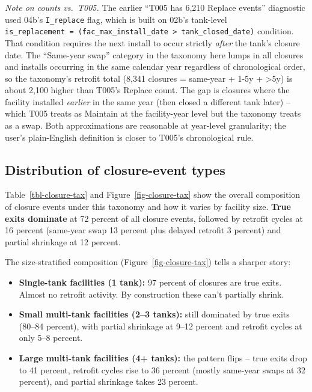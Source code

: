 \documentclass[
  11pt,
]{article}
\providecommand{\tightlist}{%
  \setlength{\itemsep}{0pt}\setlength{\parskip}{0pt}}\usepackage{longtable,booktabs,array}
\begin{document}
\emph{Note on counts vs.~T005.} The earlier ``T005 has 6,210 Replace
events'' diagnostic used 04b's \texttt{I\_replace} flag, which is built
on 02b's tank-level
\texttt{is\_replacement\ =\ (fac\_max\_install\_date\ \textgreater{}\ tank\_closed\_date)}
condition. That condition requires the next install to occur strictly
\emph{after} the tank's closure date. The ``Same-year swap'' category in
the taxonomy here lumps in all closures and installs occurring in the
same calendar year regardless of chronological order, so the taxonomy's
retrofit total (8,341 closures = same-year + 1-5y + \textgreater5y) is
about 2,100 higher than T005's Replace count. The gap is closures where
the facility installed \emph{earlier} in the same year (then closed a
different tank later) -- which T005 treats as Maintain at the
facility-year level but the taxonomy treats as a swap. Both
approximations are reasonable at year-level granularity; the user's
plain-English definition is closer to T005's chronological rule.

\subsection{Distribution of closure-event
types}\label{sec-closure-distribution}

Table~\ref{tbl-closure-tax} and Figure~\ref{fig-closure-tax} show the
overall composition of closure events under this taxonomy and how it
varies by facility size. \textbf{True exits dominate} at 72 percent of
all closure events, followed by retrofit cycles at 16 percent (same-year
swap 13 percent plus delayed retrofit 3 percent) and partial shrinkage
at 12 percent.

The size-stratified composition (Figure~\ref{fig-closure-tax}) tells a
sharper story:

\begin{itemize}
\tightlist
\item
  \textbf{Single-tank facilities (1 tank):} 97 percent of closures are
  true exits. Almost no retrofit activity. By construction these can't
  partially shrink.
\item
  \textbf{Small multi-tank facilities (2--3 tanks):} still dominated by
  true exits (80--84 percent), with partial shrinkage at 9--12 percent
  and retrofit cycles at only 5--8 percent.
\item
  \textbf{Large multi-tank facilities (4+ tanks):} the pattern flips --
  true exits drop to 41 percent, retrofit cycles rise to 36 percent
  (mostly same-year swaps at 32 percent), and partial shrinkage takes 23
  percent.
\end{itemize}
\end{document}
